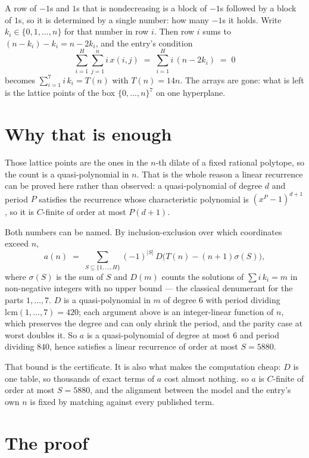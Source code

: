 \documentclass[11pt,a4paper]{article}
\theoremstyle{plain}
\theoremstyle{definition}
\begin{document}
A row of $-1$s and $1$s that is nondecreasing is a block of $-1$s followed by a block of $1$s, so it is determined by a single number: how many $-1$s it holds. Write $k_i\in\{0,1,\dots,n\}$ for that number in row $i$. Then row $i$ sums to $(n-k_i)-k_i = n-2k_i$, and the entry's condition
\[ \sum_{i=1}^{H}\sum_{j=1}^{n} i\,x(i,j) \;=\; \sum_{i=1}^{H} i\,(n-2k_i) \;=\; 0 \]
becomes $\sum_{i=1}^{7} i\,k_i = T(n)$ with $T(n)=14n$. The arrays are gone: what is left is the lattice points of the box $\{0,\dots,n\}^{7}$ on one hyperplane.

\section{Why that is enough}

Those lattice points are the ones in the $n$-th dilate of a fixed rational polytope, so the count is a quasi-polynomial in $n$. That is the whole reason a linear recurrence can be proved here rather than observed: a quasi-polynomial of degree $d$ and period $P$ satisfies the recurrence whose characteristic polynomial is $(x^{P}-1)^{d+1}$, so it is $C$-finite of order at most $P(d+1)$.

Both numbers can be named. By inclusion-exclusion over which coordinates exceed $n$,
\[ a(n)\;=\;\sum_{S\subseteq\{1,\dots,H\}}(-1)^{|S|}\,D\bigl(T(n)-(n+1)\sigma(S)\bigr), \]
where $\sigma(S)$ is the sum of $S$ and $D(m)$ counts the solutions of $\sum i\,k_i=m$ in non-negative integers with no upper bound --- the classical denumerant for the parts $1,\dots,7$. $D$ is a quasi-polynomial in $m$ of degree $6$ with period dividing $\mathrm{lcm}(1,\dots,7)=420$; each argument above is an integer-linear function of $n$, which preserves the degree and can only shrink the period, and the parity case at worst doubles it. So $a$ is a quasi-polynomial of degree at most $6$ and period dividing $840$, hence satisfies a linear recurrence of order at most $S=5880$.

That bound is the certificate. It is also what makes the computation cheap: $D$ is one table, so thousands of exact terms of $a$ cost almost nothing.
so $a$ is $C$-finite of order at most $S=5880$, and the alignment between the model and the
entry's own $n$ is fixed by matching against every published term.

\section{The proof}
\end{document}
